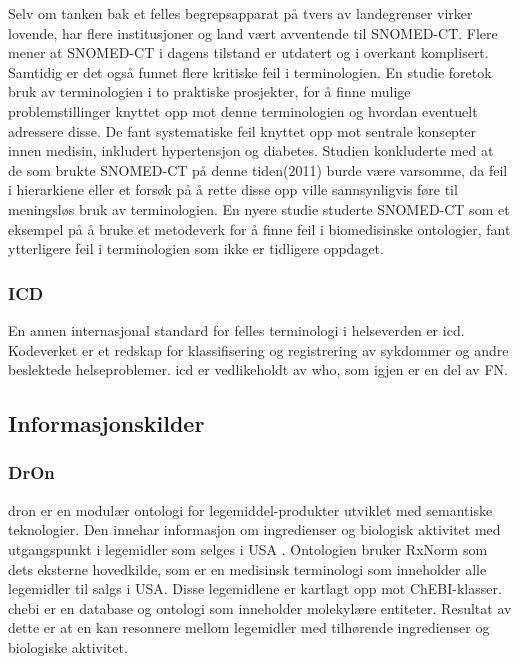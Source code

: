 Selv om tanken bak et felles begrepsapparat på tvers av landegrenser virker lovende, har flere institusjoner og land vært avventende til SNOMED-CT. Flere mener at SNOMED-CT i dagens tilstand er utdatert og i overkant komplisert. Samtidig er det også funnet flere kritiske feil i terminologien. En studie \citep{Rector-SNOMED-CT-1} foretok bruk av terminologien i to praktiske prosjekter, for å finne mulige problemstillinger knyttet opp mot denne terminologien og hvordan eventuelt adressere disse. De fant systematiske feil knyttet opp mot sentrale konsepter innen medisin, inkludert hypertensjon og diabetes. Studien konkluderte med at de som brukte SNOMED-CT på denne tiden(2011) burde være varsomme, da feil i hierarkiene eller et forsøk på å rette disse opp ville sannsynligvis føre til meningsløs bruk av terminologien. En nyere studie \citep{Rector-SNOMED-CT-2} studerte SNOMED-CT som et eksempel på å bruke et metodeverk for å finne feil i biomedisinske ontologier, fant ytterligere feil i terminologien som ikke er tidligere oppdaget.

\subsubsection{ICD}
En annen internasjonal standard for felles terminologi i helseverden er \gls{icd}. Kodeverket er et redskap for klassifisering og registrering av sykdommer og andre beslektede helseproblemer. \gls{icd} er vedlikeholdt av \gls{who}, som igjen er en del av FN.  
\subsection{Informasjonskilder}
\subsubsection{DrOn}
\gls{dron} er en modulær ontologi for legemiddel-produkter utviklet med semantiske teknologier. Den innehar informasjon om ingredienser og biologisk aktivitet med utgangspunkt i legemidler som selges i USA \citep{dron_2013}. Ontologien bruker RxNorm som dets eksterne hovedkilde, som er en medisinsk terminologi som inneholder alle legemidler til salgs i USA. Disse legemidlene er kartlagt opp mot ChEBI-klasser. \gls{chebi} er en database og ontologi som inneholder molekylære entiteter. Resultat av dette er at en kan resonnere mellom legemidler med tilhørende ingredienser og biologiske aktivitet. 

